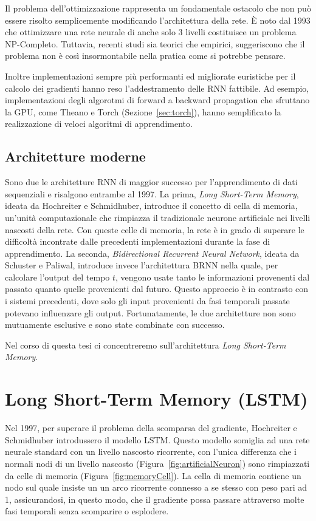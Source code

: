 Il problema dell'ottimizzazione rappresenta un fondamentale ostacolo che non pu\`o essere risolto semplicemente modificando l'architettura della rete.
\`E noto dal 1993 che ottimizzare una rete neurale di anche solo 3 livelli costituisce un problema NP-Completo.
Tuttavia, recenti studi sia teorici che empirici, suggeriscono che il problema non \`e cos\`i insormontabile nella pratica come si potrebbe pensare.

Inoltre implementazioni sempre pi\`u performanti ed migliorate euristiche per il calcolo dei gradienti hanno reso l'addestramento delle RNN fattibile.
Ad esempio, implementazioni degli algorotmi di forward a backward propagation che sfruttano la GPU, come Theano e Torch (Sezione~\ref{sec:torch}), hanno semplificato la realizzazione di veloci algoritmi di apprendimento.

\subsection{Architetture moderne}
Sono due le architetture RNN di maggior successo per l'apprendimento di dati sequenziali e risalgono entrambe al 1997.
La prima, \emph{Long Short-Term Memory}, ideata da Hochreiter e Schmidhuber, introduce il concetto di cella di memoria, un'unit\`a computazionale che rimpiazza il tradizionale neurone artificiale nei livelli nascosti della rete.
Con queste celle di memoria, la rete \`e in grado di superare le difficolt\`a incontrate dalle precedenti implementazioni durante la fase di apprendimento.
La seconda, \emph{Bidirectional Recurrent Neural Network}, ideata da Schuster e Paliwal, introduce invece l'architettura BRNN nella quale, per calcolare l'output del tempo $t$, vengono usate tanto le informazioni provenenti dal passato quanto quelle provenienti dal futuro.
Questo approccio \`e in contrasto con i sistemi precedenti, dove solo gli input provenienti da fasi temporali passate potevano influenzare gli output.
Fortunatamente, le due architetture non sono mutuamente esclusive e sono state combinate con successo.

Nel corso di questa tesi ci concentreremo sull'architettura \emph{Long Short-Term Memory}.

\section{Long Short-Term Memory (LSTM)}
Nel 1997, per superare il problema della scomparsa del gradiente, Hochreiter e Schmidhuber introdussero il modello LSTM.
Questo modello somiglia ad una rete neurale standard con un livello nascosto ricorrente, con l'unica differenza che i normali nodi di un livello nascosto (Figura~\ref{fig:artificialNeuron}) sono rimpiazzati da celle di memoria (Figura~\ref{fig:memoryCell}). %
La cella di memoria contiene un nodo sul quale insiste un un arco ricorrente connesso a se stesso con peso pari ad 1, assicurandosi, in questo modo, che il gradiente possa passare attraverso molte fasi temporali senza scomparire o esplodere.

